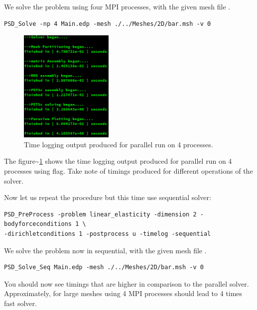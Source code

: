 We solve the problem using four MPI processes, with the given mesh file
.

\begin{lstlisting}[style=BashInputStyle]
PSD_Solve -np 4 Main.edp -mesh ./../Meshes/2D/bar.msh -v 0
\end{lstlisting}

\begin{figure}[h!]
\centering
\includegraphics[width=0.4\textwidth]{./Images/le-time-par.png}
\caption{Time logging output produced for parallel run on 4 processes.\label{time-par-le}}
\end{figure}

The figure\textasciitilde{}\ref{time-par-le} shows the time logging
output produced for parallel run on 4 processes using 
flag. Take note of timings produced for different operations of the
solver.

Now let us repeat the procedure but this time use sequential solver:

\begin{lstlisting}[style=BashInputStyle]
PSD_PreProcess -problem linear_elasticity -dimension 2 -bodyforceconditions 1 \
-dirichletconditions 1 -postprocess u -timelog -sequential
\end{lstlisting}

We solve the problem now in sequential, with the given mesh file
\psd{bar.msh}.

\begin{lstlisting}[style=BashInputStyle]
PSD_Solve_Seq Main.edp -mesh ./../Meshes/2D/bar.msh -v 0
\end{lstlisting}

You should now see timings that are higher in comparison to the parallel
solver. Approximately, for large meshes using 4 MPI processes should
lead to 4 times fast solver.
